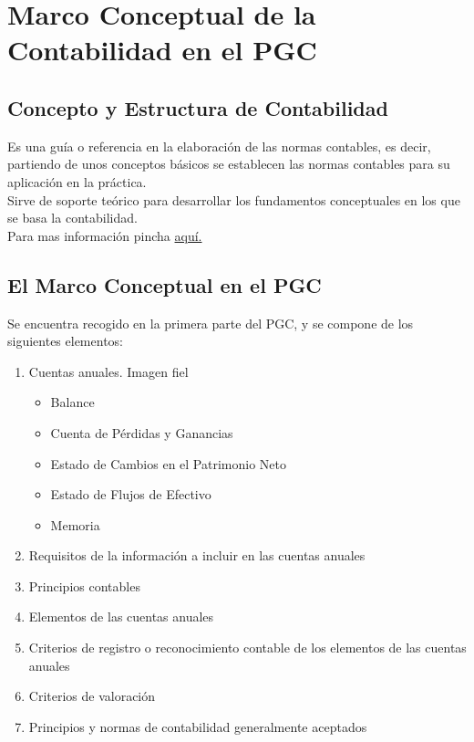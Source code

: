 \documentclass[a4paper,12pt]{article}
\begin{document}
\section{Marco Conceptual de la Contabilidad en el PGC}

\subsection{Concepto y Estructura de Contabilidad}

Es una guía o referencia en la elaboración de las normas contables, es decir, partiendo de unos conceptos básicos se establecen las normas contables para su aplicación en la práctica.\\

Sirve de soporte teórico para desarrollar los fundamentos conceptuales en los que se basa la contabilidad.\\

Para mas información pincha \href{https://www.aeca.es/old/pub/documentos/sf1r.htm}{aquí.}

\subsection{El Marco Conceptual en el PGC}

Se encuentra recogido en la primera parte del PGC, y se compone de los siguientes elementos:
\begin{enumerate}
    \item Cuentas anuales. Imagen fiel
    \begin{itemize}
        \item Balance
        \item Cuenta de Pérdidas y Ganancias
        \item Estado de Cambios en el Patrimonio Neto
        \item Estado de Flujos de Efectivo
        \item Memoria
    \end{itemize}
    \item Requisitos de la información a incluir en las cuentas anuales
    \item Principios contables
    \item Elementos de las cuentas anuales
    \item Criterios de registro o reconocimiento contable de los elementos de las cuentas anuales
    \item Criterios de valoración
    \item Principios y normas de contabilidad generalmente aceptados
\end{enumerate}
\end{document}
